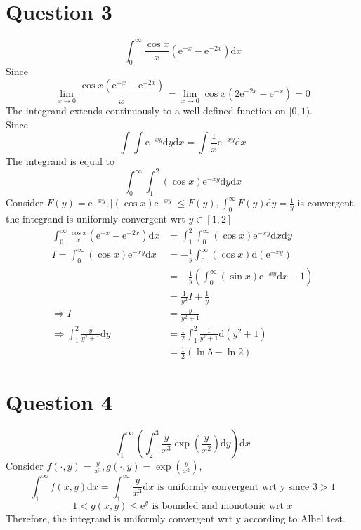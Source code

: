 \documentclass[11pt, a4paper]{article}
\begin{document}
\section*{Question 3}
$$\int_{0}^{\infty}\frac{\cos x}{x}(\mathrm{e}^{-x} - \mathrm{e}^{-2x})\mathrm{d}x$$
Since
$$\lim\limits_{x \to 0}\frac{\cos x(\mathrm{e}^{-x} - \mathrm{e}^{-2x})}{x} = \lim\limits_{x \to 0}\cos x(2\mathrm{e}^{-2x}-\mathrm{e}^{-x}) = 0$$
The integrand extends continuously to a well-defined function on $[0,1)$. \\
Since
$$\int \int \mathrm{e}^{-xy}\mathrm{d}y\mathrm{d}x = \int\frac{1}{x}\mathrm{e}^{-xy}\mathrm{d}x$$
The integrand is equal to
$$\int_{0}^{\infty}\int_{1}^{2}(\cos x)\mathrm{e}^{-xy}\mathrm{d}y\mathrm{d}x$$
Consider $F(y) = \mathrm{e}^{-xy}, |(\cos x)\mathrm{e}^{-xy}| \leq F(y), \int_{0}^{\infty}F(y)\mathrm{d}y = \frac{1}{y}$ is convergent, the integrand is uniformly convergent wrt $y \in [1, 2]$
$$\begin{aligned}
    \int_{0}^{\infty}\frac{\cos x}{x}(\mathrm{e}^{-x} - \mathrm{e}^{-2x})\mathrm{d}x &= \int_{1}^{2}\int_{0}^{\infty}(\cos x)\mathrm{e}^{-xy}\mathrm{d}x\mathrm{d}y \\
    I = \int_{0}^{\infty}(\cos x)\mathrm{e}^{-xy}\mathrm{d}x &= -\frac{1}{y}\int_{0}^{\infty}(\cos x)\mathrm{d}(\mathrm{e}^{-xy}) \\
    &= -\frac{1}{y}(\int_{0}^{\infty}(\sin x)\mathrm{e}^{-xy}\mathrm{d}x - 1)\\
    &=\frac{1}{y^2}I + \frac{1}{y}\\
    \Rightarrow I &= \frac{y}{y^2+1} \\
    \Rightarrow \int_{1}^{2}\frac{y}{y^2+1}\mathrm{d}y &= \frac{1}{2}\int_{1}^{2}\frac{1}{y^2+1}\mathrm{d}(y^2+1) \\
    &= \frac{1}{2}(\ln 5 - \ln 2)
\end{aligned}$$

\section*{Question 4}
$$\int_{1}^{\infty}(\int_{2}^{3}\frac{y}{x^3}\exp (\frac{y}{x^2}) \mathrm{d}y)\mathrm{d}x$$
Consider $f(\cdot, y)=\frac{y}{x^3}, g(\cdot, y)=\exp(\frac{y}{x^2}),$
$$\int_{1}^{\infty}f(x, y)\mathrm{d}x = \int_{1}^{\infty}\frac{y}{x^3}\mathrm{d}x \text{ is uniformly convergent wrt y since }3 > 1$$
$$1 < g(x, y) \leq \mathrm{e}^y \text{ is bounded and monotonic wrt }x$$
Therefore, the integrand is uniformly convergent wrt y according to Albel test.
\end{document}
